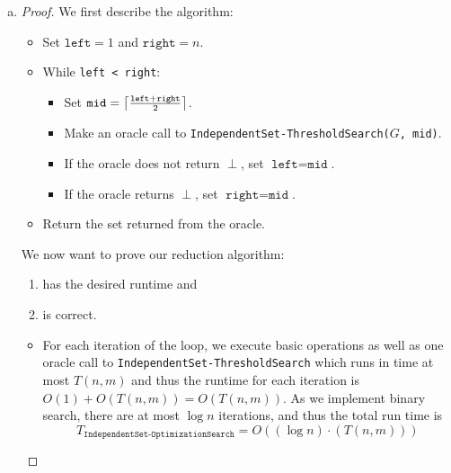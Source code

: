 \documentclass[11pt]{scrartcl}
\theoremstyle{dotlessP}
\theoremstyle{dotlessN}
\DeclarePairedDelimiter\ceil{\lceil}{\rceil} %
\begin{document}
\begin{enumerate}[(a)]
	\item 
	\begin{proof}
		We first describe the algorithm:
		\begin{itemize}
			\item Set $\texttt{left} = 1$ and $\texttt{right} = n$.
			\item While \texttt{left < right}:
				\begin{itemize}
					\item Set $\texttt{mid} = \ceil*{\frac{\texttt{left} + \texttt{right}}{2}}$.
					\item Make an oracle call to \texttt{IndependentSet-ThresholdSearch($G$, \texttt{mid})}.
					\item If the oracle does not return $\perp$, set $\texttt{left} = \texttt{mid}$.
					\item If the oracle returns  $\perp$, set $\texttt{right} = \texttt{mid}$.
				\end{itemize}
			\item Return the set returned from the oracle.
		\end{itemize}
		We now want to prove our reduction algorithm:
		\begin{enumerate}[1.]
			\item has the desired runtime and
			\item is correct.
		\end{enumerate}
		\begin{itemize}
			\item For each iteration of the loop, we execute basic operations as well as one oracle call to \texttt{IndependentSet-ThresholdSearch} which runs in time at most $T(n,m)$ and thus the runtime for each iteration is $O(1) + O(T(n,m)) = O(T(n,m))$. As we implement binary search, there are at most $\log n$ iterations, and thus the total run time is
				\[
					T_\texttt{IndependentSet-OptimizationSearch} = O((\log n) \cdot (T(n,m)))
				\] 

\end{itemize}
\end{proof}
\end{enumerate}
\end{document}
